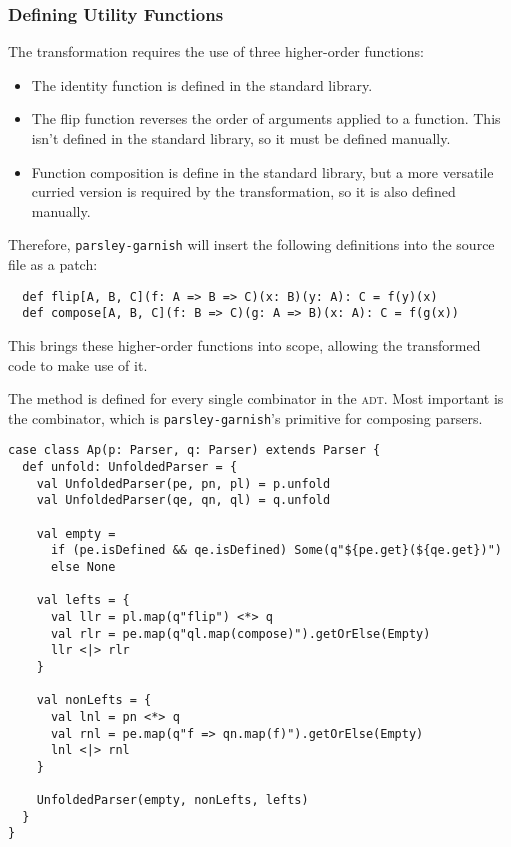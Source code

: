 \documentclass[../../main.tex]{subfiles}
\begin{document}
\subsubsection{Defining Utility Functions}
The transformation requires the use of three higher-order functions:
\begin{itemize}
  \item The identity function  is defined in the standard library.
  \item The flip function reverses the order of arguments applied to a function. This isn't defined in the standard library, so it must be defined manually.
  \item Function composition is define in the standard library, but a more versatile curried version is required by the transformation, so it is also defined manually.
\end{itemize}
%
Therefore, \texttt{parsley-garnish} will insert the following definitions into the source file as a patch:
\begin{verbatim}
  def flip[A, B, C](f: A => B => C)(x: B)(y: A): C = f(y)(x)
  def compose[A, B, C](f: B => C)(g: A => B)(x: A): C = f(g(x))
\end{verbatim}
%
This brings these higher-order functions into scope, allowing the transformed code to make use of it.

The  method is defined for every single combinator in the  \textsc{adt}.
Most important is the  combinator, which is \texttt{parsley-garnish}'s primitive for composing parsers.
%
\begin{verbatim}
case class Ap(p: Parser, q: Parser) extends Parser {
  def unfold: UnfoldedParser = {
    val UnfoldedParser(pe, pn, pl) = p.unfold
    val UnfoldedParser(qe, qn, ql) = q.unfold

    val empty =
      if (pe.isDefined && qe.isDefined) Some(q"${pe.get}(${qe.get})")
      else None

    val lefts = {
      val llr = pl.map(q"flip") <*> q
      val rlr = pe.map(q"ql.map(compose)").getOrElse(Empty)
      llr <|> rlr
    }

    val nonLefts = {
      val lnl = pn <*> q
      val rnl = pe.map(q"f => qn.map(f)").getOrElse(Empty)
      lnl <|> rnl
    }

    UnfoldedParser(empty, nonLefts, lefts)
  }
}
\end{verbatim}
\end{document}

